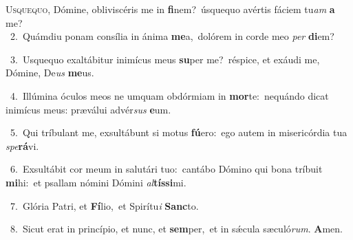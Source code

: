 \lettrine{\initial\textcolor{\initialcolor}{U}}{squequo,} Dómine, obliviscéris me in \textbf{fi}\-nem?~\star úsquequo avértis fáciem tu\textit{am} \textbf{a} me?\\
{\numbfont\textcolor{\numbcolor}{~2.}}~Quámdiu ponam consília in ánima \textbf{me}\-a,~\star dolórem in corde meo \textit{per} \textbf{di}\-em?\par
{\numbfont\textcolor{\numbcolor}{~3.}}~Usquequo exaltábitur inimícus meus \textbf{su}\-per me?~\star réspice, et exáudi me, Dómine, De\textit{us} \textbf{me}\-us.\par
{\numbfont\textcolor{\numbcolor}{~4.}}~Illúmina óculos meos ne umquam obdórmiam in \textbf{mor}\-te:~\star nequándo dicat inimícus meus: præválui advér\textit{sus} \textbf{e}\-um.\par
{\numbfont\textcolor{\numbcolor}{~5.}}~Qui tríbulant me, exsultábunt si motus \textbf{fú}\-ero:~\star ego autem in misericórdia tua \textit{spe}\-\textbf{rá}vi.\par
{\numbfont\textcolor{\numbcolor}{~6.}}~Exsultábit cor meum in salutári tuo:~\dagger cantábo Dómino qui bona tríbuit \textbf{mi}\-hi:~\star et psallam nómini Dómini \textit{al}\-\textbf{tís}\textbf{si}mi.\par
{\numbfont\textcolor{\numbcolor}{~7.}}~Glória Patri, et \textbf{Fí}\-lio,~\star et Spirítu\textit{i} \textbf{Sanc}\-to.\par
{\numbfont\textcolor{\numbcolor}{~8.}}~Sicut erat in princípio, et nunc, et \textbf{sem}\-per,~\star et in sǽcula sæculó\-\textit{rum}\-. \textbf{A}\-men.\par
